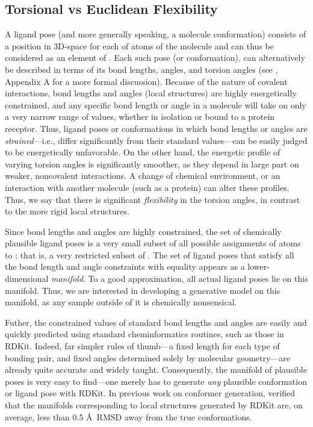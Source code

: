 \documentclass{article} \usepackage{iclr2023_conference,times}
\newcommand{\new}[1]{#1}
\newenvironment{rebuttal}{}{}
\begin{document}
\subsection{\new{Torsional vs Euclidean Flexibility}}\label{appx:torsional}
\begin{rebuttal}
A ligand pose (and more generally speaking, a molecule conformation) consists of a position in 3D-space  for each of  atoms of the molecule and can thus be considered as an element of . Each such pose (or conformation), can alternatively be described in terms of its bond lengths, angles, and torsion angles (see \citet{jing2022torsional}, Appendix A for a more formal discussion). Because of the nature of covalent interactions, bond lengths and angles (local structures) are highly energetically constrained, and any specific bond length or angle in a molecule will take on only a very narrow range of values, whether in isolation or bound to a protein receptor. Thus, ligand poses or conformations in which bond lengths or angles are \emph{strained}---i.e., differ significantly from their standard values---can be easily judged to be energetically unfavorable. On the other hand, the energetic profile of varying torsion angles is significantly smoother, as they depend in large part on weaker, noncovalent interactions. A change of chemical environment, or an interaction with another molecule (such as a protein) can alter these profiles. Thus, we say that there is significant \emph{flexibility} in the torsion angles, in contrast to the more rigid local structures.

Since bond lengths and angles are highly constrained, the set of chemically plausible ligand poses is a very small subset of all possible assignments of atoms to ; that is, a very restricted subset of . The set of ligand poses that satisfy all the bond length and angle constraints with equality appears as a lower-dimensional \emph{manifold}. To a good approximation, all actual ligand poses lie on this manifold. Thus, we are interested in developing a generative model on this manifold, as any sample outside of it is chemically nonsensical.

Futher, the constrained values of standard bond lengths and angles are easily and quickly predicted using standard cheminformatics routines, such as those in RDKit. Indeed, far simpler rules of thumb---a fixed length for each type of bonding pair, and fixed angles determined solely by molecular geometry---are already quite accurate and widely taught. Consequently, the manifold of plausible poses is very easy to find---one merely has to generate \emph{any} plausible conformation or ligand pose with RDKit. In previous work on conformer generation, \citet{jing2022torsional} verified that the manifolds corresponding to local structures generated by RDKit are, on average, less than 0.5 \AA\ RMSD away from the true conformations.


\end{rebuttal}
\end{document}
